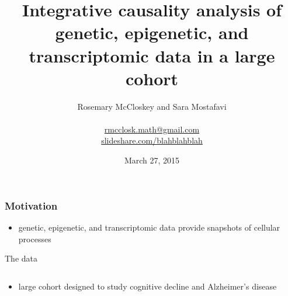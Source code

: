 \documentclass{beamer}
\title[Omics data integration]{Integrative causality analysis of genetic,
epigenetic, and transcriptomic data in a large cohort}
\author[R. McCloskey \& S. Mostafavi]
    {Rosemary McCloskey and Sara Mostafavi \\\hfill\\
     \url{rmcclosk.math@gmail.com} \\
     \url{slideshare.com/blahblahblah}}
\date{March 27, 2015}
\begin{document}
\maketitle

\begin{frame}
    \frametitle{Motivation}
    \begin{itemize}
        \item genetic, epigenetic, and transcriptomic data provide snapshots of
            cellular processes
    \begin{center}
        \vspace{-0.5cm}
        
    \end{center}
    \end{itemize}
\end{frame}

\begin{frame}{The data}
    \begin{columns}
        \begin{column}{0.35\textwidth}
            \begin{itemize}
                \item large cohort designed to study cognitive decline and
                    Alzheimer's disease
            \end{itemize}
        \end{column}
        \begin{column}{0.7\textwidth}
            
        \end{column}
    \end{columns}
\end{frame}
\end{document}
